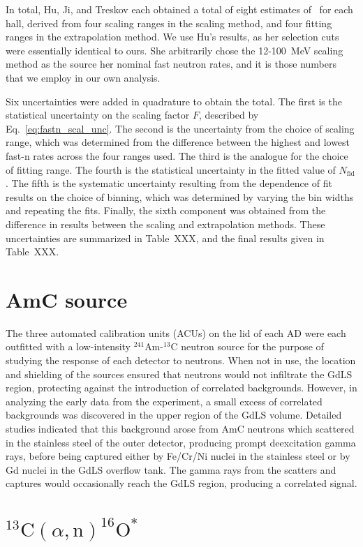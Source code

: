 \documentclass[../thesis.tex]{subfiles}
\begin{document}
In total, Hu, Ji, and Treskov each obtained a total of eight estimates of \rfn\
for each hall, derived from four scaling ranges in the scaling method, and four
fitting ranges in the extrapolation method. We use Hu's results, as her
selection cuts were essentially identical to ours. She arbitrarily chose the
12-100~MeV scaling method as the source her nominal fast neutron rates, and it
is those numbers that we employ in our own analysis.

Six uncertainties were added in quadrature to obtain the total. The first is the
statistical uncertainty on the scaling factor $F$, described by
Eq.~\ref{eq:fastn_scal_unc}. The second is the uncertainty from the choice of
scaling range, which was determined from the difference between the highest and
lowest fast-n rates across the four ranges used. The third is the analogue for
the choice of fitting range. The fourth is the statistical uncertainty in the
fitted value of $N_\mathrm{fid}$. The fifth is the systematic uncertainty
resulting from the dependence of fit results on the choice of binning, which was
determined by varying the bin widths and repeating the fits. Finally, the sixth
component was obtained from the difference in results between the scaling and
extrapolation methods. These uncertainties are summarized in Table~XXX, and the
final results given in Table~XXX.

\section{AmC source}

The three automated calibration units (ACUs) on the lid of each AD were each
outfitted with a low-intensity $^{241}$Am-$^{13}$C neutron source for the
purpose of studying the response of each detector to neutrons. When not in use,
the location and shielding of the sources ensured that neutrons would not
infiltrate the GdLS region, protecting against the introduction of correlated
backgrounds. However, in analyzing the early data from the experiment, a small
excess of correlated backgrounds was discovered in the upper region of the GdLS
volume. Detailed studies indicated that this background arose from AmC neutrons
which scattered in the stainless steel of the outer detector, producing prompt
deexcitation gamma rays, before being captured either by Fe/Cr/Ni nuclei in the
stainless steel or by Gd nuclei in the GdLS overflow tank. The gamma rays from
the scatters and captures would occasionally reach the GdLS region, producing a
correlated signal.

\section{$^{13}\mathrm{C}(\alpha, \mathrm{n})^{16}\mathrm{O}^*$}
\end{document}

